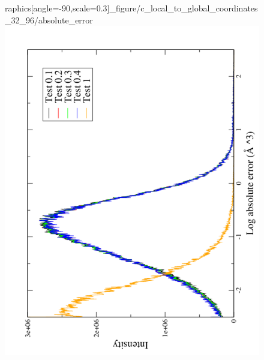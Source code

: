 \begin{figure}[h]
\begin{minipage}[t]{1.1\textwidth}
\begin{center}
raphics[angle=-90,scale=0.3]{_figure/c_local_to_global_coordinates_32_96/absolute_error}\includegraphics[angle=-90,scale=0.3]{_figure/c_local_to_global_coordinates_32_96/log_absolute_error}

\end{center}
\end{minipage}
\end{figure}
